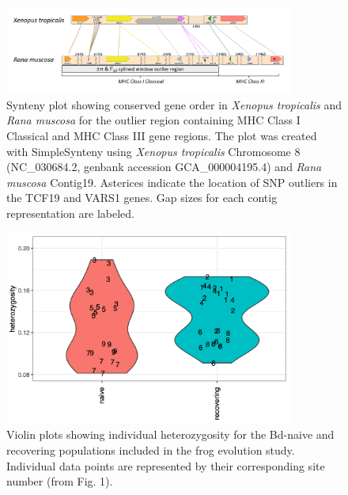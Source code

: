 \documentclass[9pt,twoside,lineno]{pnas-new}
\begin{document}
\begin{figure}

{\centering \includegraphics[width=0.85\textwidth]{figures/synteny_figure.png}

}

\caption{\label{fig-synteny-plot}Synteny plot showing conserved gene
order in \emph{Xenopus tropicalis} and \emph{Rana muscosa} for the
outlier region containing MHC Class I Classical and MHC Class III gene
regions. The plot was created with SimpleSynteny \citep{veltri2016}
using \emph{Xenopus tropicalis} Chromosome 8 (NC\_030684.2, genbank
accession GCA\_000004195.4) and \emph{Rana muscosa} Contig19. Asterices
indicate the location of SNP outliers in the TCF19 and VARS1 genes. Gap
sizes for each contig representation are labeled.}

\end{figure}\clearpage

\newpage

\begin{figure}

{\centering \includegraphics[width=0.85\textwidth]{figures/violin_plot_heterozy_by_group.png}

}

\caption{\label{fig-violinplot-heterozy}Violin plots showing individual
heterozygosity for the Bd-naive and recovering populations included in
the frog evolution study. Individual data points are represented by
their corresponding site number (from
Fig. 1).}

\end{figure}\clearpage
\end{document}
